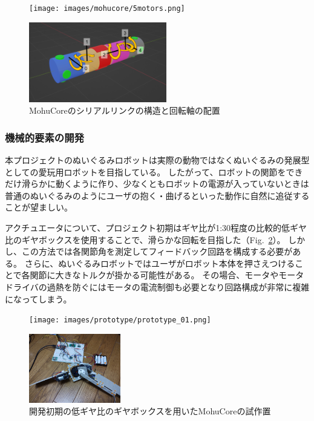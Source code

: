 \documentclass[uplatex,a4paper,12pt]{jsarticle}
\renewcommand{\figurename}{Fig.}
\newcommand{\figref}[1]{\figurename~\ref{#1}}
\begin{document}
\begin{figure}[htbp]
  \centering
  \begin{minipage}[c]{0.48\linewidth}
    \centering
    \texttt{[image: images/mohucore/5motors.png]}
  \end{minipage}
  \begin{minipage}[c]{0.48\linewidth}
    \centering
    \includegraphics[keepaspectratio,width=6cm,clip]{images/mohucore/rot_arrangement.png}
  \end{minipage}
  \caption{MohuCoreのシリアルリンクの構造と回転軸の配置}
  \label{fig:mohucore:serial_link}
\end{figure}

\subsubsection{機械的要素の開発}
本プロジェクトのぬいぐるみロボットは実際の動物ではなくぬいぐるみの発展型としての愛玩用ロボットを目指している。
したがって、ロボットの関節をできだけ滑らかに動くように作り、少なくともロボットの電源が入っていないときは普通のぬいぐるみのようにユーザの抱く・曲げるといった動作に自然に追従することが望ましい。

アクチュエータについて、プロジェクト初期はギヤ比が1:30程度の比較的低ギヤ比のギヤボックスを使用することで、滑らかな回転を目指した（\figref{fig:prototype_01}）。
しかし、この方法では各関節角を測定してフィードバック回路を構成する必要がある。
さらに、ぬいぐるみロボットではユーザがロボット本体を押さえつけることで各関節に大きなトルクが掛かる可能性がある。
その場合、モータやモータドライバの過熱を防ぐにはモータの電流制御も必要となり回路構成が非常に複雑になってしまう。

\begin{figure}[htbp]
  \centering
  \begin{minipage}[c]{0.64\linewidth}
    \centering
    \texttt{[image: images/prototype/prototype\_01.png]}
  \end{minipage}
  \begin{minipage}[c]{0.32\linewidth}
    \centering
    \includegraphics[keepaspectratio,width=4cm,clip]{images/prototype/prototype_01_circuit.jpg}
  \end{minipage}
  \caption{開発初期の低ギヤ比のギヤボックスを用いたMohuCoreの試作置}
  \label{fig:prototype_01}
\end{figure}
\end{document}
